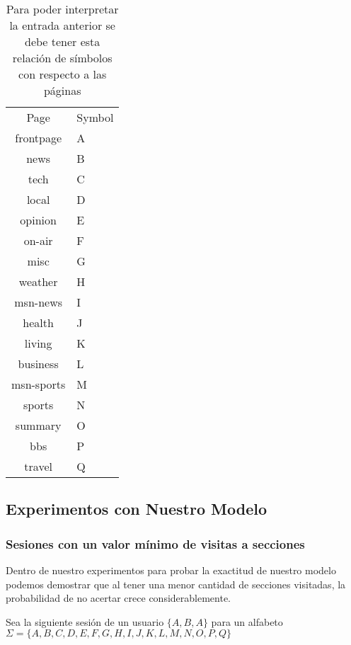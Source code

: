 \begin{table}[]
	\centering

	\label{table-list-symbol}
	\begin{tabular}{cl}
		Page       & Symbol \\ \cline{1-2}
		frontpage  & A      \\
		news       & B      \\
		tech       & C      \\
		local      & D      \\
		opinion    & E      \\
		on-air     & F      \\
		misc       & G      \\
		weather    & H      \\
		msn-news   & I      \\
		health     & J      \\
		living     & K      \\
		business   & L      \\
		msn-sports & M      \\
		sports     & N      \\
		summary    & O      \\
		bbs        & P      \\
		travel     & Q      \\ 
	\end{tabular}
	\caption{Para poder interpretar la entrada anterior se debe tener esta relación de símbolos con respecto a las páginas}
\end{table}





\subsection{Experimentos con Nuestro Modelo}


\subsubsection{Sesiones con un valor mínimo de visitas a secciones}

Dentro de nuestro experimentos para probar la exactitud de nuestro modelo podemos demostrar que al tener una menor cantidad de secciones visitadas, la probabilidad de no acertar crece considerablemente.


Sea la siguiente sesión de un usuario 
$\{A , B , A  \}  $ para un alfabeto $\Sigma=\{A,B,C,D,E,F,G,H,I,J,K,L,M,N,O,P,Q \} $


